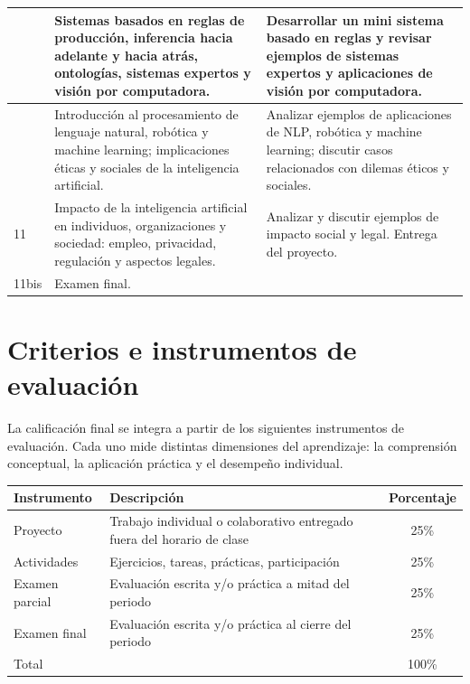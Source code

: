 \documentclass[12pt]{article}
\begin{document}
\begin{longtable}{|>{\centering\arraybackslash}p{1.2cm}|p{7.2cm}|p{7.2cm}|}
	9 &
	Sistemas basados en reglas de producción, inferencia hacia adelante y hacia atrás, ontologías, sistemas expertos y visión por computadora. &
	Desarrollar un mini sistema basado en reglas y revisar ejemplos de sistemas expertos y aplicaciones de visión por computadora. \\
	\hline
	
	10 &
	Introducción al procesamiento de lenguaje natural, robótica y machine learning; implicaciones éticas y sociales de la inteligencia artificial. &
	Analizar ejemplos de aplicaciones de NLP, robótica y machine learning; discutir casos relacionados con dilemas éticos y sociales. \\
	\hline
	
	11 &
	Impacto de la inteligencia artificial en individuos, organizaciones y sociedad: empleo, privacidad, regulación y aspectos legales. &
	Analizar y discutir ejemplos de impacto social y legal. Entrega del proyecto. \\
	\hline
	
	11bis &
	Examen final. &
	 \\
	\hline
	
\end{longtable}



	
	\section*{Criterios e instrumentos de evaluación}
	
	La calificación final se integra a partir de los siguientes instrumentos de evaluación. Cada uno mide distintas dimensiones del aprendizaje: la comprensión conceptual, la aplicación práctica y el desempeño individual.
	
	\begin{center}
		\begin{tabular}{|l|p{7cm}|c|}
			\hline
			\textbf{Instrumento} & \textbf{Descripción} & \textbf{Porcentaje} \\
			\hline
			Proyecto & Trabajo individual o colaborativo entregado fuera del horario de clase & 25\% \\
			\hline
			Actividades & Ejercicios, tareas, prácticas, participación & 25\% \\
			\hline
			Examen parcial & Evaluación escrita y/o práctica a mitad del periodo & 25\% \\
			\hline
			Examen final & Evaluación escrita y/o práctica al cierre del periodo & 25\% \\
			\hline
			Total & & 100\% \\
			\hline
		\end{tabular}
	\end{center}
	
\end{document}
